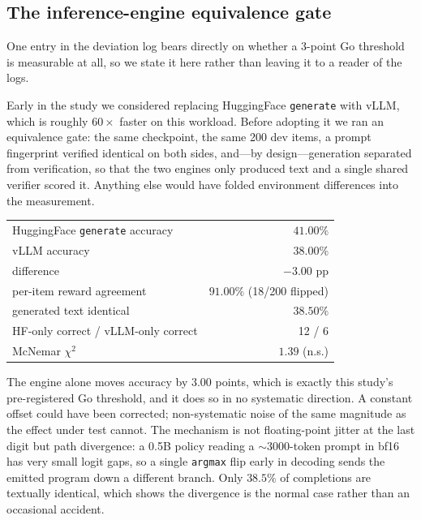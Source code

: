 \subsection{The inference-engine equivalence gate}
\label{subsec:enginegate}

One entry in the deviation log bears directly on whether a $3$-point Go
threshold is measurable at all, so we state it here rather than leaving it to a
reader of the logs.

Early in the study we considered replacing HuggingFace \texttt{generate} with
vLLM, which is roughly $60\times$ faster on this workload. Before adopting it we
ran an equivalence gate: the same checkpoint, the same 200 dev items, a prompt
fingerprint verified identical on both sides, and---by design---generation
separated from verification, so that the two engines only produced text and a
single shared verifier scored it. Anything else would have folded environment
differences into the measurement.

\begin{center}
\begin{tabular}{lr}
\toprule
HuggingFace \texttt{generate} accuracy & $41.00\%$ \\
vLLM accuracy & $38.00\%$ \\
difference & $-3.00$ pp \\
\midrule
per-item reward agreement & $91.00\%$ (18/200 flipped) \\
generated text identical & $38.50\%$ \\
HF-only correct / vLLM-only correct & 12 / 6 \\
McNemar $\chi^2$ & $1.39$ (n.s.) \\
\bottomrule
\end{tabular}
\end{center}

The engine alone moves accuracy by $3.00$ points, which is exactly this study's
pre-registered Go threshold, and it does so in no systematic direction. A
constant offset could have been corrected; non-systematic noise of the same
magnitude as the effect under test cannot. The mechanism is not floating-point
jitter at the last digit but path divergence: a 0.5B policy reading a
${\sim}3000$-token prompt in bf16 has very small logit gaps, so a single
\texttt{argmax} flip early in decoding sends the emitted program down a
different branch. Only $38.5\%$ of completions are textually identical, which
shows the divergence is the normal case rather than an occasional accident.

